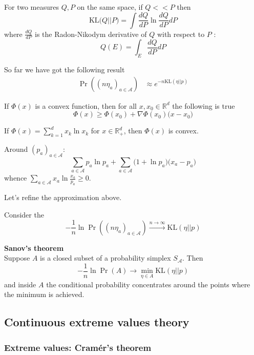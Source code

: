 \documentclass[a4paper]{article}
\newcommand{\brac}[1]{{\left ( #1 \right )}}
\newcommand{\Real}{\mathbb{R}}
\newcommand{\Acal}{\mathcal{A}}
\begin{document}
For two measures $Q,P$ on the same space, if $Q<<P$ then
\[\text{KL}\big( Q \lvert \rvert P\big) = \int \frac{dQ}{dP} \ln \frac{dQ}{dP} dP\]
where $\frac{dQ}{dP}$ is the Radon-Nikodym derivative of $Q$ with respect to $P$ :
\[Q(E) = \int_E \frac{dQ}{dP} dP\]

So far we have got the following result
\begin{align*}
	\Pr\brac{\brac{n \eta_a}_{a\in \Acal}} &\approx e^{- n \text{KL}\brac{\eta \lvert\rvert p}}
\end{align*}

If $\Phi(x)$ is a convex function, then for all $x,x_0\in \Real^d$ the following is true
\[ \Phi(x) \geq \Phi(x_0) + \nabla \Phi(x_0) \big(x-x_0\big) \]

If $\Phi(x) = \sum_{k=1}^d x_k \ln x_k$ for $x\in \Real_+^d$, then $\Phi(x)$ is convex.

Around $\brac{p_a}_{a\in \Acal}$:
\[\sum_{a\in \Acal} p_a \ln p_a + \sum_{a\in \Acal} \big(1 + \ln p_a \big) \big(x_a - p_a\big)\]
whence $\sum_{a\in \Acal} x_a \ln\frac{x_a}{p_a} \geq 0$.


Let's refine the approximation above.

Consider the 
\[-\frac{1}{n}\ln\Pr\brac{\brac{n \eta_a}_{a\in \Acal}} \overset{n\to\infty}{\to} \text{KL}\brac{\eta \lvert\rvert p} \]

\noindent\textbf{Sanov's theorem}\hfill\\
Suppose $A$ is a closed subset of a probability simplex $S_\Acal$. Then 
\[-\frac{1}{n}\ln \Pr\brac{A}\to \min_{\eta\in A} \text{KL}\brac{\eta \lvert\rvert p} \]
and inside $A$ the conditional probability concentrates around the points where the minimum is achieved.



\subsection{Continuous extreme values theory} %
\label{sub:continuous_extreme_values_theory}

\subsubsection{Extreme values: Cram\'er's theorem} %
\label{ssub:extreme_values_cramer_theorem}
\end{document}
